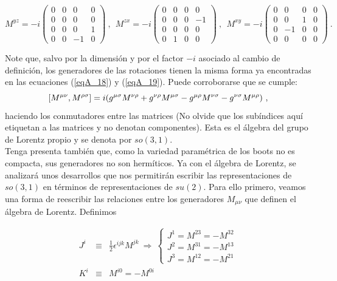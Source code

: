  \begin{equation}
M^{yz}=-i\left( 
\begin{array}{cccc}
0 & 0 & 0 & 0 \\ 
0 & 0 & 0 & 0 \\ 
0 & 0 & 0 & 1 \\ 
0 & 0 & -1 & 0
\end{array}
\right) ~,~\ M^{zx}=-i\left( 
\begin{array}{cccc}
0 & 0 & 0 & 0 \\ 
0 & 0 & 0 & -1 \\ 
0 & 0 & 0 & 0 \\ 
0 & 1 & 0 & 0
\end{array}
\right) ~,~\ M^{xy}=-i\left( 
\begin{array}{cccc}
0 & 0 & 0 & 0 \\ 
0 & 0 & 1 & 0 \\ 
0 & -1 & 0 & 0 \\ 
0 & 0 & 0 & 0
\end{array}
\right) ~.
\end{equation}

Note que, salvo por la dimensión y por el factor $-i$ asociado al cambio de definición, los generadores de las rotaciones tienen la misma forma ya encontradas en las ecuaciones (\ref{eqA_18}) y (\ref{eqA_19}). Puede corroborarse que se cumple:
\begin{equation}
    \comm{M^{\mu \nu}}{M^{\rho \sigma}} = i \qty(g^{\mu \sigma}M^{\nu \rho} + g^{\nu \rho}M^{\mu \sigma} - g^{\mu \rho}M^{\nu \sigma}-g^{\nu \sigma}M^{\mu \rho} )~,
    \label{alorentz}
\end{equation}
haciendo los conmutadores entre las matrices (No olvide que los subíndices aquí etiquetan a las matrices y no denotan componentes). Esta es el álgebra del grupo de Lorentz propio y se denota por $so(3,1)$.\\

Tenga presenta también que, como la variedad paramétrica de los boots no es compacta, sus generadores no son hermíticos. Ya con el álgebra de Lorentz, se analizará unos desarrollos que nos permitirán escribir las representaciones de $so(3,1)$ en términos de representaciones de $su(2)$. Para ello primero, veamos una forma de reescribir las relaciones entre los generadores $M_{\mu \nu}$ que definen el álgebra de Lorentz. Definimos

\begin{eqnarray}
J^{i} &\equiv &\frac{1}{2}\epsilon ^{ijk}M^{jk}~\Longrightarrow ~\left\{ 
\begin{array}{c}
J^{1}=M^{23}=-M^{32} \\ 
J^{2}=M^{31}=-M^{13} \\ 
J^{3}=M^{12}=-M^{21}
\end{array}
\label{eqA_1.36}
\right.  \\
K^{i} &\equiv &M^{i0}=-M^{0i}
\label{eqA_1.37}
\end{eqnarray}

